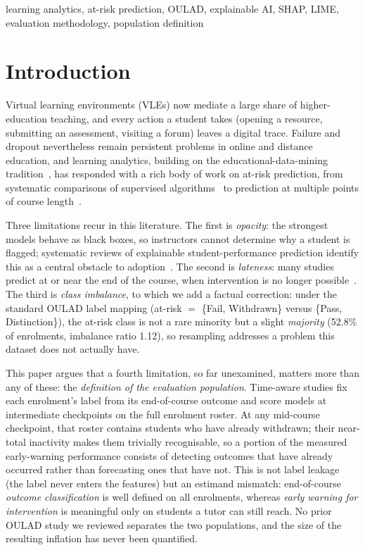 \documentclass[conference]{IEEEtran}
\begin{document}
\begin{IEEEkeywords}
learning analytics, at-risk prediction, OULAD, explainable AI, SHAP, LIME,
evaluation methodology, population definition
\end{IEEEkeywords}

\section{Introduction}

Virtual learning environments (VLEs) now mediate a large share of
higher-education teaching, and every action a student takes (opening a
resource, submitting an assessment, visiting a forum) leaves a digital
trace. Failure and dropout nevertheless remain persistent problems in online
and distance education, and learning analytics, building on the
educational-data-mining tradition~\cite{romero2010,romero2013,baker2009},
has responded with a rich body of work on at-risk prediction, from
systematic comparisons of
supervised algorithms~\cite{tomasevic2020} to prediction at multiple points
of course length~\cite{adnan2021}.

Three limitations recur in this literature. The first is \emph{opacity}:
the strongest models behave as black boxes, so instructors cannot determine
why a student is flagged; systematic reviews of explainable
student-performance prediction identify this as a central obstacle to
adoption~\cite{alamri2021}. The second is \emph{lateness}: many studies
predict at or near the end of the course, when intervention is no longer
possible~\cite{adnan2021}. The third is \emph{class imbalance}, to which
we add a factual correction: under the standard OULAD label mapping
(at-risk $=$ \{Fail, Withdrawn\} versus \{Pass, Distinction\}), the at-risk
class is not a rare minority but a slight \emph{majority} (52.8\% of
enrolments, imbalance ratio 1.12), so resampling addresses a problem this
dataset does not actually have.

This paper argues that a fourth limitation, so far unexamined, matters more
than any of these: the \emph{definition of the evaluation population}.
Time-aware studies fix each enrolment's label from its end-of-course
outcome and score models at intermediate checkpoints on the full enrolment
roster. At any mid-course checkpoint, that roster contains students who have
already withdrawn; their near-total inactivity makes them trivially
recognisable, so a portion of the measured early-warning performance
consists of detecting outcomes that have already occurred rather than
forecasting ones that have not. This is not label leakage (the label never
enters the features) but an estimand mismatch: end-of-course
\emph{outcome classification} is well defined on all enrolments, whereas
\emph{early warning for intervention} is meaningful only on students a
tutor can still reach. No prior OULAD study we reviewed separates the two
populations, and the size of the resulting inflation has never been
quantified.
\end{document}
